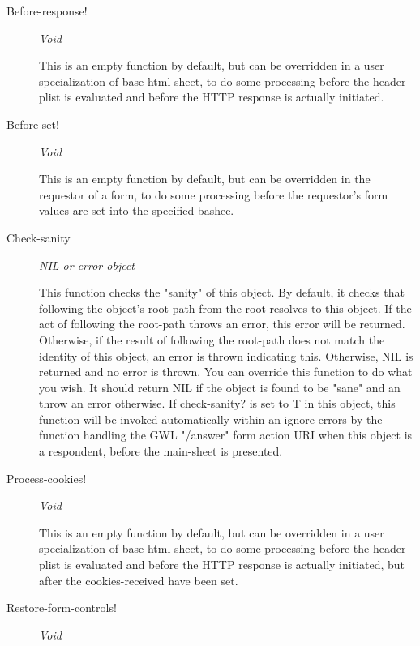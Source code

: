 \documentclass [11pt]{book}
\begin{document}
\begin{itemize}
\begin{description}
\item [Before-response!]
\emph{Void}

 This is an empty function by default, but can be overridden in
a user specialization of base-html-sheet, to do some processing before the
header-plist is evaluated and before the HTTP response is actually initiated.




\item [Before-set!]
\emph{Void}

 This is an empty function by default, but can be overridden in
the requestor of a form, to do some processing before the requestor's form
values are set into the specified bashee.




\item [Check-sanity]
\emph{NIL or error object}

 This function checks the "sanity" of this object. By
default, it checks that following the object's root-path from the root resolves
to this object. If the act of following the root-path throws an error, this error
will be returned. Otherwise, if the result of following the root-path does not
match the identity of this object, an error is thrown indicating this. Otherwise,
NIL is returned and no error is thrown. You can override this function to do what
you wish. It should return NIL if the object is found to be "sane" and an throw
an error otherwise.
If check-sanity? is set to T in this object, this function will be invoked automatically
within an ignore-errors by the function handling the GWL "/answer" form action URI
when this object is a respondent, before the main-sheet is presented.




\item [Process-cookies!]
\emph{Void}

 This is an empty function by default, but can be overridden in
a user specialization of base-html-sheet, to do some processing before the
header-plist is evaluated and before the HTTP response is actually initiated, but after
the cookies-received have been set.




\item [Restore-form-controls!]
\emph{Void}


\end{description}
\end{itemize}
\end{document}
